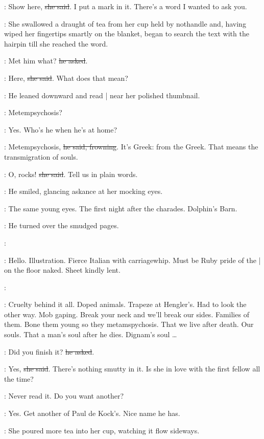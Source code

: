 \Molly:
Show here,
\sout{she said}.
I put a mark in it.
There's a word I wanted to ask you.

:
She swallowed a draught of tea from her cup held by nothandle
and, having wiped her fingertips smartly on the blanket,
began to search the text with the hairpin
till she reached the word.

\Bloom:
Met him what?
\sout{he asked}.

\Molly:
Here,
\sout{she said}.
What does that mean?

:
He leaned downward and read |
near her polished thumbnail.

\Bloom:
Metempsychosis?

\Molly:
Yes.
Who's he when he's at home?

\Bloom:
Metempsychosis,
\sout{he said, frowning}.
It's Greek: from the Greek.
That means the transmigration of souls.

\Molly:
O, rocks!
\sout{she said}.
Tell us in plain words.

:
He smiled, glancing askance at her mocking eyes.

\BloomInt:
The same young eyes.
The first night after the charades.
Dolphin's Barn.

:
He turned over the smudged pages.

\Voice:

\BloomInt:
Hello.
Illustration.
Fierce Italian with carriagewhip.
Must be Ruby pride of the |
on the floor naked.
Sheet kindly lent.

\Voice:

\BloomInt:
Cruelty behind it all.
Doped animals.
Trapeze at Hengler's.
Had to look the other way.
Mob gaping.
Break your neck and we'll break our sides.
Families of them.
Bone them young so they metamspychosis.
That we live after death.
Our souls.
That a man's soul after he dies.
Dignam's soul …

\Bloom:
Did you finish it?
\sout{he asked}.

\Molly:
Yes,
\sout{she said}.
There's nothing smutty in it.
Is she in love with the first fellow all the time?

\Bloom:
Never read it.
Do you want another?

\Molly:
Yes.
Get another of Paul de Kock's.
Nice name he has.

:
She poured more tea into her cup,
watching it flow sideways.

